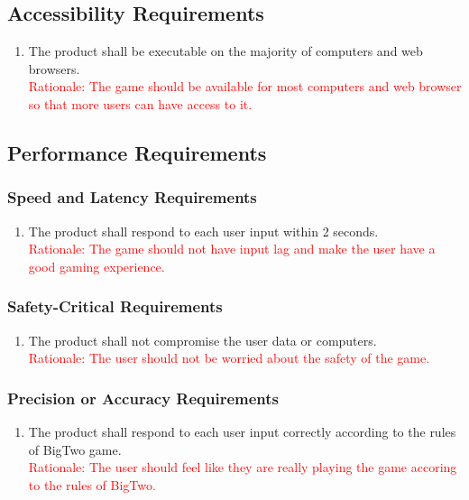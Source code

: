 \documentclass[12pt, titlepage]{article}
\begin{document}
\subsection{Accessibility Requirements}
\begin{enumerate}
    \item The product shall be executable on the majority of computers and web browsers.\\
    \textcolor{red}{Rationale: The game should be available for most computers and web browser so that more users can have access to it.}
\end{enumerate}

\subsection{Performance Requirements}
\subsubsection{Speed and Latency Requirements}
\begin{enumerate}
    \item The product shall respond to each user input within 2 seconds.\\
    \textcolor{red}{Rationale: The game should not have input lag and make the user have a good gaming experience.}
\end{enumerate}

\subsubsection{Safety-Critical Requirements}
\begin{enumerate}
    \item The product shall not compromise the user data or computers.\\
    \textcolor{red}{Rationale: The user should not be worried about the safety of the game.}
\end{enumerate}

\subsubsection{Precision or Accuracy Requirements}
\begin{enumerate}
    \item The product shall respond to each user input correctly according to the rules of BigTwo game.\\
    \textcolor{red}{Rationale: The user should feel like they are really playing the game accoring to the rules of BigTwo.}
\end{enumerate}
\end{document}
